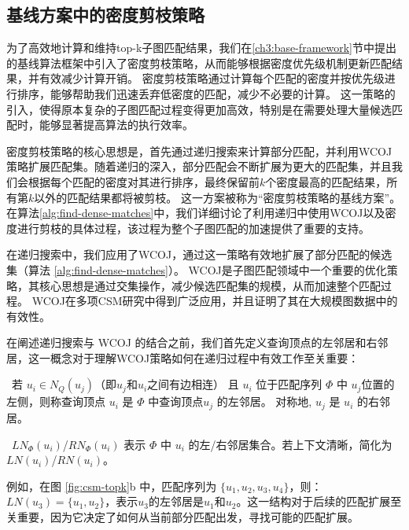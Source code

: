 \subsection{基线方案中的密度剪枝策略}
\label{ch3:wegiht-prune-baseline}
为了高效地计算和维持top-k子图匹配结果，我们在\ref{ch3:base-framework}节中提出的基线算法框架中引入了密度剪枝策略，从而能够根据密度优先级机制更新匹配结果，并有效减少计算开销。
密度剪枝策略通过计算每个匹配的密度并按优先级进行排序，能够帮助我们迅速丢弃低密度的匹配，减少不必要的计算。
这一策略的引入，使得原本复杂的子图匹配过程变得更加高效，特别是在需要处理大量候选匹配时，能够显著提高算法的执行效率。

密度剪枝策略的核心思想是，首先通过递归搜索来计算部分匹配，并利用WCOJ策略扩展匹配集。随着递归的深入，部分匹配会不断扩展为更大的匹配集，并且我们会根据每个匹配的密度对其进行排序，最终保留前$k$个密度最高的匹配结果，所有第$k$以外的匹配结果都将被剪枝。
这一方案被称为“密度剪枝策略的基线方案”。在算法\ref{alg:find-dense-matches}中，我们详细讨论了利用递归中使用WCOJ以及密度进行剪枝的具体过程，该过程为整个子图匹配的加速提供了重要的支持。

在递归搜索中，我们应用了WCOJ，通过这一策略有效地扩展了部分匹配的候选集（算法 \ref{alg:find-dense-matches}）。
WCOJ是子图匹配领域中一个重要的优化策略，其核心思想是通过交集操作，减少候选匹配集的规模，从而加速整个匹配过程。
WCOJ在多项CSM研究中得到广泛应用\cite{csm-graphflow-DBLP:conf/sigmod/KankanamgeSMCS17,csm-graphflowpp-DBLP:journals/tods/MhedhbiKS21,csm-survey:DBLP:journals/pvldb/SunSLH22}，并且证明了其在大规模图数据中的有效性。

在阐述递归搜索与 WCOJ 的结合之前，我们首先定义查询顶点的左邻居和右邻居，这一概念对于理解WCOJ策略如何在递归过程中有效工作至关重要：

\textbullet~若 $u_i \in N_Q(u_j)$（即$u_j$和$u_i$之间有边相连） 且 $u_i$ 位于匹配序列 $\Phi$ 中 $u_j$位置的左侧，则称查询顶点 $u_i$ 是 $\Phi$ 中查询顶点$u_j$ 的左邻居。
    对称地, $u_j$ 是 $u_i$ 的右邻居。

\textbullet~$LN_{\Phi}(u_i)$/$RN_{\Phi}(u_i)$ 表示 $\Phi$ 中 $u_i$ 的左/右邻居集合。若上下文清晰，简化为 $LN(u_i)$/$RN(u_i)$。

例如，在图 \ref{fig:csm-topk}b 中，匹配序列为 $\{u_1, u_2, u_3, u_4\}$，则：$LN(u_3) = \{u_1, u_2\}$，表示$u_3$的左邻居是$u_1$和$u_2$。这一结构对于后续的匹配扩展至关重要，因为它决定了如何从当前部分匹配出发，寻找可能的匹配扩展。

